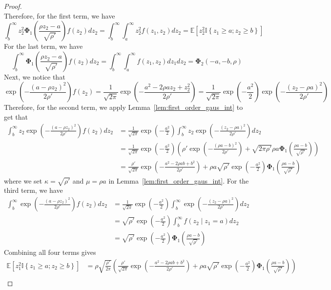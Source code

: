\documentclass[10pt]{article} %
\theoremstyle{definition}
\theoremstyle{plain}
\newcommand{\paren}[1]{\left(#1\right)}
\newcommand{\indy}[1]{\mathbb{I}\left\{#1\right\}}
\providecommand{\E}{\mathbb{E}}
\begin{document}
\begin{proof}
\[    \]
    Therefore, for the first term, we have
    \[
        \int_b^\infty z_2^2\bm{\Phi}_1\paren{\frac{\rho z_2-a}{\sqrt{\rho'}}}f\paren{z_2}dz_2 = \int_b^\infty\int_a^\infty z_2^2f\paren{z_1,z_2}dz_2 = \E\left[z_2^2\indy{z_1\geq a;z_2\geq b}\right]
    \]
    For the last term, we have
    \[
        \int_b^\infty\bm{\Phi}_1\paren{\frac{\rho z_2-a}{\sqrt{\rho'}}}f\paren{z_2}dz_2 = \int_b^\infty\int_a^\infty f\paren{z_1,z_2}dz_1dz_2 = \bm{\Phi}_2\paren{-a, -b, \rho}
    \]
    Next, we notice that
    \[
        \exp\paren{-\frac{\paren{a-\rho z_2}^2}{2\rho'}}f\paren{z_2} = \frac{1}{\sqrt{2\pi}}\exp\paren{-\frac{a^2 - 2\rho az_2 + z_2^2}{2\rho'}} = \frac{1}{\sqrt{2\pi}}\exp\paren{-\frac{a^2}{2}}\exp\paren{-\frac{\paren{z_2 - \rho a}^2}{2\rho'}}
    \]
    Therefore, for the second term, we apply Lemma~\ref{lem:first_order_gaus_int} to get that
    \begin{align*}
        \int_b^\infty z_2\exp\paren{-\frac{\paren{a-\rho z_2}^2}{2\rho'}}f\paren{z_2}dz_2 & = \frac{1}{\sqrt{2\pi}}\exp\paren{-\frac{a^2}{2}}\int_b^\infty z_2\exp\paren{-\frac{\paren{z_2 - \rho a}^2}{2\rho'}}dz_2\\
        & = \frac{1}{\sqrt{2\pi}}\exp\paren{-\frac{a^2}{2}}\paren{\rho'\exp\paren{-\frac{\paren{\rho a - b}^2}{2\rho'}} + \sqrt{2\pi\rho'}\rho a\bm{\Phi}_1\paren{\frac{\rho a- b}{\sqrt{\rho'}}}}\\
        & = \frac{\rho'}{\sqrt{2\pi}}\exp\paren{-\frac{a^2 - 2\rho ab + b^2}{2\rho'}}+ \rho a\sqrt{\rho'}\exp\paren{-\frac{a^2}{2}}\bm{\Phi}_1\paren{\frac{\rho a- b}{\sqrt{\rho'}}}
    \end{align*}
    where we set $\kappa=\sqrt{\rho'}$ and $\mu =\rho a$ in Lemma~\ref{lem:first_order_gaus_int}. For the third term, we have
    \begin{align*}
        \int_b^\infty\exp\paren{-\frac{\paren{a-\rho z_2}^2}{2\rho'}}f\paren{z_2}dz_2 & = \frac{1}{\sqrt{2\pi}}\exp\paren{-\frac{a^2}{2}}\int_b^\infty\exp\paren{-\frac{\paren{z_2 - \rho a}^2}{2\rho'}}dz_2\\
        & = \sqrt{\rho'}\exp\paren{-\frac{a^2}{2}}\int_b^\infty f\paren{z_2\mid z_1 = a}dz_2\\
        & = \sqrt{\rho'}\exp\paren{-\frac{a^2}{2}}\bm{\Phi}_1\paren{\frac{\rho a - b}{\sqrt{\rho'}}}
    \end{align*}
    Combining all four terms gives
    \begin{align*}
        \E\left[z_1^2\indy{z_1\geq a; z_2\geq b}\right] & = \rho\sqrt{\frac{\rho'}{2\pi}}\paren{\frac{\rho'}{\sqrt{2\pi}}\exp\paren{-\frac{a^2 - 2\rho ab + b^2}{2\rho'}}+ \rho a\sqrt{\rho'}\exp\paren{-\frac{a^2}{2}}\bm{\Phi}_1\paren{\frac{\rho a- b}{\sqrt{\rho'}}}}\\

\end{align*}
\end{proof}
\end{document}
